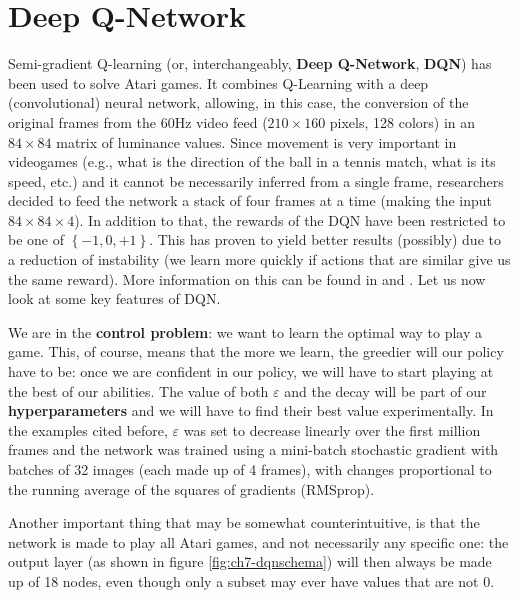 \section{Deep Q-Network}
Semi-gradient Q-learning (or, interchangeably, \textbf{Deep Q-Network}, \textbf{DQN}) has been used to solve Atari games. It combines Q-Learning with a deep (convolutional) neural network, allowing, in this case, the conversion of the original frames from the 60Hz video feed ($210 \times 160$ pixels, 128 colors) in an $84 \times 84$ matrix of luminance values. Since movement is very important in videogames (e.g., what is the direction of the ball in a tennis match, what is its speed, etc.) and it cannot be necessarily inferred from a single frame, researchers decided to feed the network a stack of four frames at a time (making the input $84 \times 84 \times 4$). In addition to that, the rewards of the DQN have been restricted to be one of $\left\{-1,0,+1\right\}$. This has proven to yield better results (possibly) due to a reduction of instability (we learn more quickly if actions that are similar give us the same reward). More information on this can be found in \cite{mnih2013atari} and \cite{mnih2015humanlevel}. Let us now look at some key features of DQN.

We are in the \textbf{control problem}: we want to learn the optimal way to play a game. This, of course, means that the more we learn, the greedier will our policy have to be: once we are confident in our policy, we will have to start playing at the best of our abilities. The value of both $\varepsilon$ and the decay will be part of our \textbf{hyperparameters} and we will have to find their best value experimentally. In the examples cited before, $\varepsilon$ was set to decrease linearly over the first million frames and the network was trained using a mini-batch stochastic gradient with batches of 32 images (each made up of 4 frames), with changes proportional to the running average of the squares of gradients (RMSprop).

Another important thing that may be somewhat counterintuitive, is that the network is made to play all Atari games, and not necessarily any specific one: the output layer (as shown in figure \ref{fig:ch7-dqnschema}) will then always be made up of 18 nodes, even though only a subset may ever have values that are not 0.

